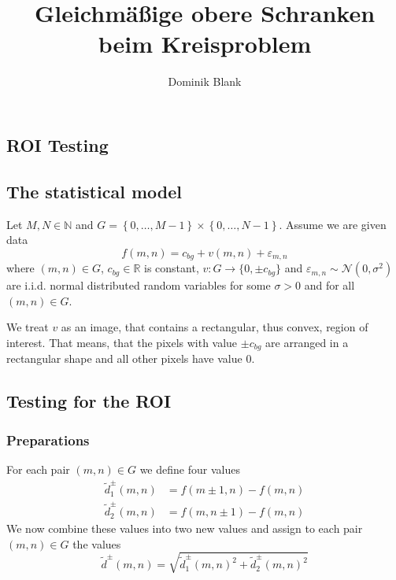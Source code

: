 \documentclass{beamer}
\author{Dominik Blank}
\title{Gleichmäßige obere Schranken beim Kreisproblem}
\begin{document}
\begin{frame}
	\tableofcontents
\end{frame}

\begin{frame}
	\section{ROI Testing}
	
	\subsection{The statistical model}
	
	Let $M, N \in \mathbb{N}$ and $G = \left\{ 0, \dots, M-1 \right\} \times  \left\{ 0, \dots, N-1 \right\}$. Assume we are given data
	\begin{equation}\label{f}
		f(m, n) = c_{bg} + v(m, n) + \varepsilon_{m, n}
	\end{equation}
	where $(m, n) \in G$, $c_{bg} \in \mathbb{R}$ is constant, $v: G \to \{ 0, \pm c_{bg} \}$ and $\varepsilon_{m, n} \sim \mathcal{N}(0, \sigma^2)$ are i.i.d. normal distributed random variables for some $\sigma > 0$ and for all $(m, n) \in G$.
	
	We treat $v$ as an image, that contains a rectangular, thus convex, region of interest. That means, that the pixels with value $\pm c_{bg}$ are arranged in a rectangular shape and all other pixels have value $0$.
\end{frame}

\begin{frame}
	\subsection{Testing for the ROI}
	
	\subsubsection{Preparations}
	
	For each pair $(m, n) \in G$ we define four values
	\begin{align}
		\tilde{d}^\pm_1(m, n) &= f(m \pm 1, n) - f(m, n) \label{d1} \\
		\tilde{d}^\pm_2(m, n) &= f(m, n \pm 1) - f(m, n) \label{d2}
	\end{align}
	We now combine these values into two new values and assign to each pair $(m, n) \in G$ the values
	\begin{equation}\label{d_tilde}
		\tilde{d}^\pm(m, n) = \sqrt{\tilde{d}_1^\pm(m, n)^2 + \tilde{d}_2^\pm(m, n)^2}
	\end{equation}
\end{frame}
\end{document}
